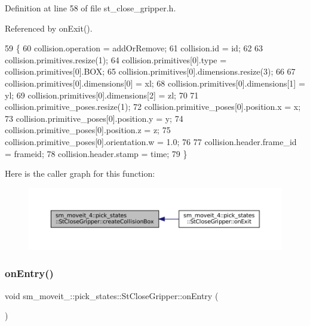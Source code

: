 Definition at line 58 of file st\+\_\+close\+\_\+gripper.\+h.



Referenced by on\+Exit().


\begin{DoxyCode}
59          \{
60             collision.operation = addOrRemove;
61             collision.id = id;
62 
63             collision.primitives.resize(1);
64             collision.primitives[0].type = collision.primitives[0].BOX;
65             collision.primitives[0].dimensions.resize(3);
66 
67             collision.primitives[0].dimensions[0] = xl;
68             collision.primitives[0].dimensions[1] = yl;
69             collision.primitives[0].dimensions[2] = zl;
70 
71             collision.primitive\_poses.resize(1);
72             collision.primitive\_poses[0].position.x = x;
73             collision.primitive\_poses[0].position.y = y;
74             collision.primitive\_poses[0].position.z = z;
75             collision.primitive\_poses[0].orientation.w = 1.0;
76 
77             collision.header.frame\_id = frameid;
78             collision.header.stamp = time;
79          \}
\end{DoxyCode}
Here is the caller graph for this function\+:
\nopagebreak
\begin{figure}[H]
\begin{center}
\leavevmode
\includegraphics[width=350pt]{structsm__moveit__4_1_1pick__states_1_1StCloseGripper_a7522e4d331379b935519d24fd34ce39d_icgraph}
\end{center}
\end{figure}
\mbox{\label{structsm__moveit__4_1_1pick__states_1_1StCloseGripper_a8d208da87aa5bc3758b3769fe56b5c42}} 
\subsubsection{\texorpdfstring{on\+Entry()}{onEntry()}}
{\footnotesize\ttfamily void sm\+\_\+moveit\+\_\+::pick\+\_\+states\+::\+St\+Close\+Gripper\+::on\+Entry (\begin{DoxyParamCaption}{ }\end{DoxyParamCaption})\hspace{0.3cm}{\ttfamily [inline]}}



